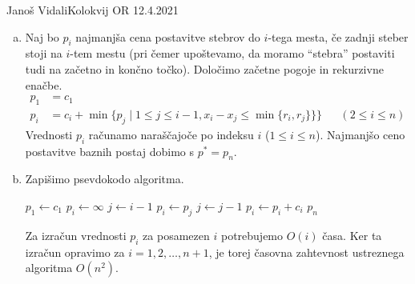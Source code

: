 \begin{naloga}{Janoš Vidali}{Kolokvij OR 12.4.2021}
\begin{odgovor}
\begin{enumerate}[(a)]
\item Naj bo $p_i$ najmanjša cena postavitve stebrov do $i$-tega mesta,
če zadnji steber stoji na $i$-tem mestu
(pri čemer upoštevamo,
da moramo ``stebra'' postaviti tudi na začetno in končno točko).
Določimo začetne pogoje in rekurzivne enačbe.
\begin{align*}
p_1 &= c_1 \\
p_i &= c_i + \min\{p_j \mid 1 \le j \le i-1, x_i - x_j \le \min\{r_i, r_j\}\}\} && (2 \le i \le n)
\end{align*}
Vrednosti $p_i$ računamo naraščajoče po indeksu $i$ ($1 \le i \le n$).
Najmanjšo ceno postavitve baznih postaj dobimo s $p^* = p_n$.

\item Zapišimo psevdokodo algoritma.
\begin{small}
\begin{algorithmic}
	\State $p_1 \gets c_1$
	    \State $p_i \gets \infty$
	    \State $j \gets i-1$
	            \State $p_i \gets p_j$
	        \EndIf
	        \State $j \gets j-1$
	    \EndWhile
	    \State $p_i \gets p_i + c_i$
	\EndFor
	\State \Return $p_n$
\EndFunction
\end{algorithmic}
\end{small}

Za izračun vrednosti $p_i$ za posamezen $i$
potrebujemo $O(i)$ časa.
Ker ta izračun opravimo za $i = 1, 2, \dots, n+1$,
je torej časovna zahtevnost ustreznega algoritma $O(n^2)$.


\end{enumerate}
\end{odgovor}
\end{naloga}
